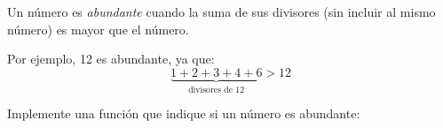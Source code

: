 \documentclass[11pt,spanish,a5paper,landscape]{article}
\begin{document}
  \thispagestyle{empty}

  Un número es \emph{abundante}
  cuando la suma de sus divisores
  (sin incluir al mismo número)
  es mayor que el número.

  Por ejemplo, 12 es abundante, ya que:
  \[
     \underbrace{1 + 2 + 3 + 4 + 6}_{\text{divisores de 12}} > 12
  \]

  Implemente una función que indique si un número es abundante:

  
\end{document}
